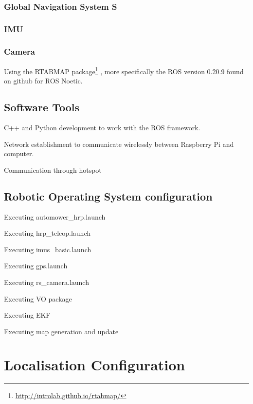 \subsubsection{Global Navigation System S}
\noindent 

\subsubsection{IMU}
\noindent 


\subsubsection{Camera}
\noindent Using the \gls{RTABMAP} package\footnote{\url{http://introlab.github.io/rtabmap/}}\cite{6094602} \cite{labbe_rtab-map_2019}, more specifically the \gls{ROS} version 0.20.9 found on github for \gls{ROS} Noetic.



\subsection{Software Tools}
\noindent 
C++ and Python development to work with the ROS framework.

Network establishment to communicate wirelessly between Raspberry Pi and computer.

Communication through hotspot 


\subsection{Robotic Operating System configuration}
\label{ssec:ros}
\noindent 
Executing automower\_hrp.launch

Executing hrp\_teleop.launch

Executing imus\_basic.launch

Executing gps.launch

Executing rs\_camera.launch

Executing VO package

Executing EKF

Executing map generation and update





 
\section{Localisation Configuration}
\label{sec:locConf}


